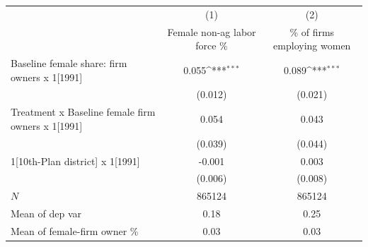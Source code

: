 {
\def\sym#1{\ifmmode^{#1}\else\(^{#1}\)\fi}
\begin{tabular}{l*{2}{c}}
\hline\hline
            &\multicolumn{1}{c}{(1)}         &\multicolumn{1}{c}{(2)}         \\
            &Female non-ag labor force \%         &\% of firms employing women         \\
\hline
Baseline female share: firm owners x 1[1991]&       0.055\sym{***}&       0.089\sym{***}\\
            &     (0.012)         &     (0.021)         \\
[1em]
Treatment x Baseline female firm owners x 1[1991]&       0.054         &       0.043         \\
            &     (0.039)         &     (0.044)         \\
[1em]
1[10th-Plan district] x 1[1991]&      -0.001         &       0.003         \\
            &     (0.006)         &     (0.008)         \\
\hline
\(N\)       &      865124         &      865124         \\
Mean of dep var&        0.18         &        0.25         \\
Mean of female-firm owner \%&        0.03         &        0.03         \\
\hline\hline
\end{tabular}
}

